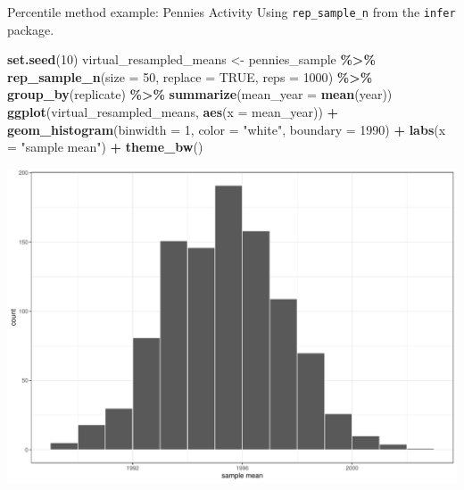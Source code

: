 \documentclass[
  ignorenonframetext,
]{beamer}
\newenvironment{Shaded}{\begin{snugshade}}{\end{snugshade}}
\newcommand{\AttributeTok}[1]{\textcolor[rgb]{0.13,0.29,0.53}{#1}}
\newcommand{\ConstantTok}[1]{\textcolor[rgb]{0.56,0.35,0.01}{#1}}
\newcommand{\DecValTok}[1]{\textcolor[rgb]{0.00,0.00,0.81}{#1}}
\newcommand{\FunctionTok}[1]{\textcolor[rgb]{0.13,0.29,0.53}{\textbf{#1}}}
\newcommand{\NormalTok}[1]{#1}
\newcommand{\OtherTok}[1]{\textcolor[rgb]{0.56,0.35,0.01}{#1}}
\newcommand{\SpecialCharTok}[1]{\textcolor[rgb]{0.81,0.36,0.00}{\textbf{#1}}}
\newcommand{\StringTok}[1]{\textcolor[rgb]{0.31,0.60,0.02}{#1}}
\begin{document}
\begin{frame}[fragile]{Percentile method example: Pennies Activity}
\protect\hypertarget{percentile-method-example-pennies-activity}{}
Using \texttt{rep\_sample\_n} from the \texttt{infer} package.

\tiny

\begin{Shaded}
\begin{Highlighting}[]
\FunctionTok{set.seed}\NormalTok{(}\DecValTok{10}\NormalTok{)}
\NormalTok{virtual\_resampled\_means }\OtherTok{\textless{}{-}}\NormalTok{ pennies\_sample }\SpecialCharTok{\%\textgreater{}\%} 
  \FunctionTok{rep\_sample\_n}\NormalTok{(}\AttributeTok{size =} \DecValTok{50}\NormalTok{, }\AttributeTok{replace =} \ConstantTok{TRUE}\NormalTok{, }\AttributeTok{reps =} \DecValTok{1000}\NormalTok{) }\SpecialCharTok{\%\textgreater{}\%} 
  \FunctionTok{group\_by}\NormalTok{(replicate) }\SpecialCharTok{\%\textgreater{}\%} 
  \FunctionTok{summarize}\NormalTok{(}\AttributeTok{mean\_year =} \FunctionTok{mean}\NormalTok{(year))}
\FunctionTok{ggplot}\NormalTok{(virtual\_resampled\_means, }\FunctionTok{aes}\NormalTok{(}\AttributeTok{x =}\NormalTok{ mean\_year)) }\SpecialCharTok{+}
  \FunctionTok{geom\_histogram}\NormalTok{(}\AttributeTok{binwidth =} \DecValTok{1}\NormalTok{, }\AttributeTok{color =} \StringTok{"white"}\NormalTok{, }\AttributeTok{boundary =} \DecValTok{1990}\NormalTok{) }\SpecialCharTok{+}
  \FunctionTok{labs}\NormalTok{(}\AttributeTok{x =} \StringTok{"sample mean"}\NormalTok{) }\SpecialCharTok{+}
  \FunctionTok{theme\_bw}\NormalTok{()}
\end{Highlighting}
\end{Shaded}

\begin{center}\includegraphics[width=0.6\linewidth,height=0.4\textheight]{Week10_Lect_files/figure-beamer/unnamed-chunk-11-1} \end{center}
\normalsize
\end{frame}
\end{document}
